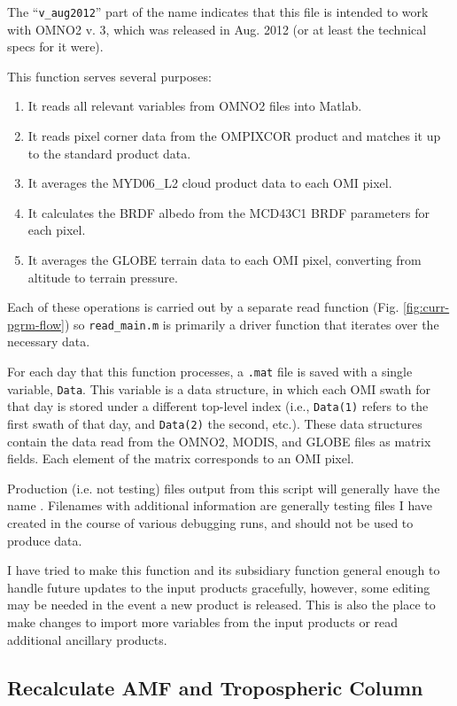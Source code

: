\documentclass[12pt]{article}
\begin{document}
	 The ``\texttt{v\_aug2012}'' part of the name indicates that this file is intended to work with OMNO2 v. 3, which was released in Aug. 2012 (or at least the technical specs for it were).  
	 
	 This function serves several purposes: 
		\begin{enumerate}
 		 \item It reads all relevant variables from OMNO2 files into Matlab.
 		 \item It reads pixel corner data from the OMPIXCOR product and matches it up to the standard product data.
		 \item It averages the MYD06\_L2 cloud product data to each OMI pixel.
		 \item It calculates the BRDF albedo from the MCD43C1 BRDF parameters for each pixel.
		 \item It averages the GLOBE terrain data to each OMI pixel, converting from altitude to terrain pressure.
		\end{enumerate}
Each of these operations is carried out by a separate read function (Fig. \ref{fig:curr-pgrm-flow}) so \lstinline$read_main.m$ is primarily a driver function that iterates over the necessary data.		
		
	For each day that this function processes, a \texttt{.mat} file is saved with a single variable, \texttt{Data}.  This variable is a data structure, in which each OMI swath for that day is stored under a different top-level index (i.e., \texttt{Data(1)} refers to the first swath of that day, and \texttt{Data(2)} the second, etc.).  These data structures contain the data read from the OMNO2, MODIS, and GLOBE files as matrix fields.  Each element of the matrix corresponds to an OMI pixel.
	
	Production (i.e. not testing) files output from this script will generally have the name .  Filenames with additional information are generally testing files I have created in the course of various debugging runs, and should not be used to produce  data.
	
	I have tried to make this function and its subsidiary function general enough to handle future updates to the input products gracefully, however, some editing may be needed in the event a new product is released. This is also the place to make changes to import more variables from the input products or read additional ancillary products.
	
	\subsection{Recalculate AMF and Tropospheric Column}
	
\end{document}
